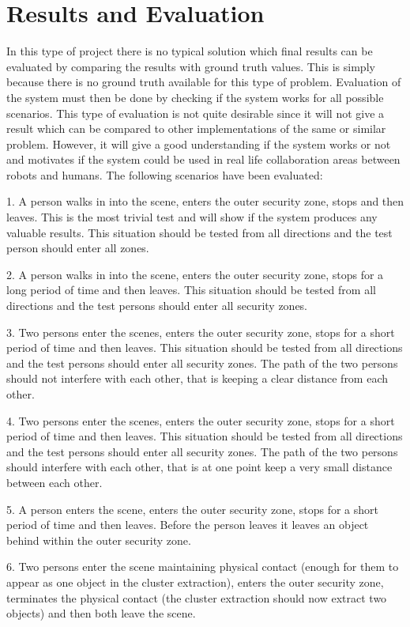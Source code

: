 \section{Results and Evaluation}
In this type of project there is no typical solution which final results can be evaluated by comparing the results with ground truth values. This is simply because there is no ground truth available for this type of problem. Evaluation of the system must then be done by checking if the system works for all possible scenarios. This type of evaluation is not quite desirable since it will not give a result which can be compared to other implementations of the same or similar problem. However, it will give a good understanding if the system works or not and motivates if the system could be used in real life collaboration areas between robots and humans. The following scenarios have been evaluated:

1. A person walks in into the scene, enters the outer security zone, stops and then leaves. This is the most trivial test and will show if the system produces any valuable results. This situation should be tested from all directions and the test person should enter all zones. 

2.  A person walks in into the scene, enters the outer security zone, stops for a long period of time and then leaves. This situation should be tested from all directions and the test persons should enter all security zones.

3. Two persons enter the scenes, enters the outer security zone, stops for a short period of time and then leaves. This situation should be tested from all directions and the test persons should enter all security zones. The path of the two persons should not interfere with each other, that is keeping a clear distance from each other. 

4. Two persons enter the scenes, enters the outer security zone, stops for a short period of time and then leaves. This situation should be tested from all directions and the test persons should enter all security zones. The path of the two persons should interfere with each other, that is at one point keep a very small distance between each other. 

5. A person enters the scene, enters the outer security zone, stops for a short period of time and then leaves. Before the person leaves it leaves an object behind within the outer security zone. 

6. Two persons enter the scene maintaining physical contact (enough for them to appear as one object in the cluster extraction), enters the outer security zone, terminates the physical contact (the cluster extraction should now extract two objects) and then both leave the scene.

